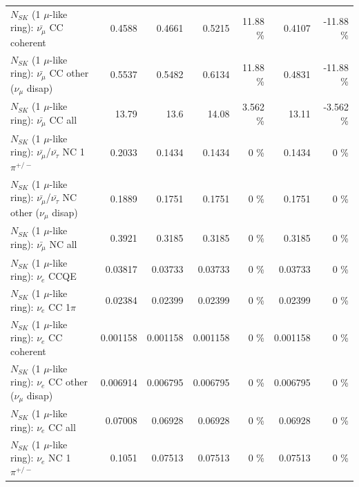\begin{table}
\begin{tabular}{| l | r | r | r  r | r  r |}
                       $N_{SK}$ (1 $\mu$-like ring): $\bar{\nu_\mu}$ CC coherent &          0.4588 &          0.4661 &          0.5215 &    11.88 \%  &          0.4107 &   -11.88 \%  \\ 
        $N_{SK}$ (1 $\mu$-like ring): $\bar{\nu_\mu}$ CC other ($\nu_\mu$ disap) &          0.5537 &          0.5482 &          0.6134 &    11.88 \%  &          0.4831 &   -11.88 \%  \\ 
                          $N_{SK}$ (1 $\mu$-like ring): $\bar{\nu_{\mu}}$ CC all &           13.79 &            13.6 &           14.08 &    3.562 \%  &           13.11 &   -3.562 \%  \\ 
\hline
  $N_{SK}$ (1 $\mu$-like ring): $\bar{\nu_\mu}$/$\bar{\nu_\tau}$ NC 1$\pi^{+/-}$ &          0.2033 &          0.1434 &          0.1434 &        0 \%  &          0.1434 &        0 \%  \\ 
$N_{SK}$ (1 $\mu$-like ring): $\bar{\nu_\mu}$/$\bar{\nu_\tau}$ NC other ($\nu_\mu$ disap) &          0.1889 &          0.1751 &          0.1751 &        0 \%  &          0.1751 &        0 \%  \\ 
                          $N_{SK}$ (1 $\mu$-like ring): $\bar{\nu_{\mu}}$ NC all &          0.3921 &          0.3185 &          0.3185 &        0 \%  &          0.3185 &        0 \%  \\ 
\hline
\hline
\hline
                                      $N_{SK}$ (1 $\mu$-like ring): $\nu_e$ CCQE &         0.03817 &         0.03733 &         0.03733 &        0 \%  &         0.03733 &        0 \%  \\ 
                                 $N_{SK}$ (1 $\mu$-like ring): $\nu_e$ CC 1$\pi$ &         0.02384 &         0.02399 &         0.02399 &        0 \%  &         0.02399 &        0 \%  \\ 
                               $N_{SK}$ (1 $\mu$-like ring): $\nu_e$ CC coherent &        0.001158 &        0.001158 &        0.001158 &        0 \%  &        0.001158 &        0 \%  \\ 
                $N_{SK}$ (1 $\mu$-like ring): $\nu_e$ CC other ($\nu_\mu$ disap) &        0.006914 &        0.006795 &        0.006795 &        0 \%  &        0.006795 &        0 \%  \\ 
                                  $N_{SK}$ (1 $\mu$-like ring): $\nu_{e}$ CC all &         0.07008 &         0.06928 &         0.06928 &        0 \%  &         0.06928 &        0 \%  \\ 
\hline
                           $N_{SK}$ (1 $\mu$-like ring): $\nu_e$ NC 1$\pi^{+/-}$ &          0.1051 &         0.07513 &         0.07513 &        0 \%  &         0.07513 &        0 \%  \\ 

\end{tabular}
\end{table}
